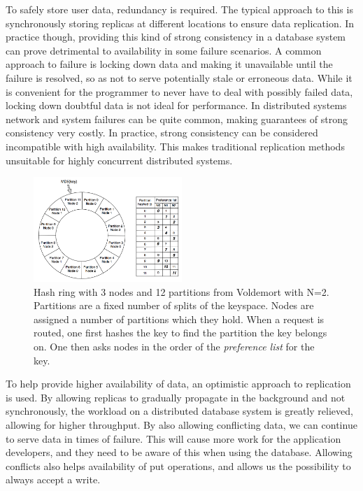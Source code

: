 To safely store user data, redundancy is required. 
The typical approach to this is synchronously storing replicas at different locations to ensure data replication. 
In practice though, providing this kind of strong consistency in a database system can prove detrimental to availability in some failure scenarios.
A common approach to failure is locking down data and making it unavailable until the failure is resolved, so as not to serve potentially stale or erroneous data.
While it is convenient for the programmer to never have to deal with possibly failed data, locking down doubtful data is not ideal for performance.
In distributed systems network and system failures can be quite common, making guarantees of strong consistency very costly. In practice, strong consistency can be considered incompatible with high availability.
This makes traditional replication methods unsuitable for highly concurrent distributed systems.

\begin{figure}
    \includegraphics[width=0.5\textwidth]{background/figures/hashring_voldemort}
    \caption{Hash ring with 3 nodes and 12 partitions from Voldemort\cite{dynamo} with N=2. Partitions are a fixed number of splits of the keyspace. Nodes are assigned a number of partitions which they hold. When a request is routed, one first hashes the key to find the partition the key belongs on. One then asks nodes in the order of the \emph{preference list} for the key.}
    \label{fig:voldemort_hashring}
\end{figure}

To help provide higher availability of data, an optimistic approach to replication is used.
By allowing replicas to gradually propagate in the background and not synchronously, the workload on a distributed database system is greatly relieved, allowing for higher throughput. By also allowing conflicting data, we can continue to serve data in times of failure. This will cause more work for the application developers, and they need to be aware of this when using the database. Allowing conflicts also helps availability of put operations, and allows us the possibility to always accept a write.

